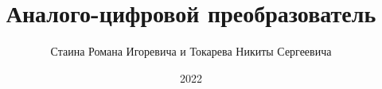 \documentclass[spec, och, labwork]{shiza}
\begin{document}
\chair{}

\title{Аналого-цифровой преобразователь}






\author{Стаина Романа Игоревича и Токарева Никиты Сергеевича}








\date{2022}

\maketitle

\end{document}
